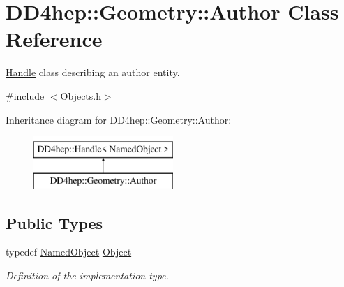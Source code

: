 \hypertarget{class_d_d4hep_1_1_geometry_1_1_author}{}\section{D\+D4hep\+:\+:Geometry\+:\+:Author Class Reference}
\label{class_d_d4hep_1_1_geometry_1_1_author}


\hyperlink{class_d_d4hep_1_1_handle}{Handle} class describing an author entity.  




{\ttfamily \#include $<$Objects.\+h$>$}

Inheritance diagram for D\+D4hep\+:\+:Geometry\+:\+:Author\+:\begin{figure}[H]
\begin{center}
\leavevmode
\includegraphics[height=2.000000cm]{class_d_d4hep_1_1_geometry_1_1_author}
\end{center}
\end{figure}
\subsection*{Public Types}
\begin{DoxyCompactItemize}
\item 
typedef \hyperlink{class_d_d4hep_1_1_named_object}{Named\+Object} \hyperlink{class_d_d4hep_1_1_geometry_1_1_author_a253185ac4c6734b22d0b2f6b8161bf11}{Object}
\begin{DoxyCompactList}\small\item\em Definition of the implementation type. \end{DoxyCompactList}\end{DoxyCompactItemize}
